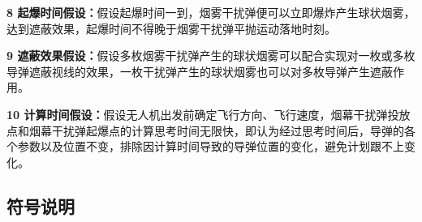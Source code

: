 \documentclass[withoutpreface,bwprint]{cumcmthesis} %
\begin{document}
\textbf{8 起爆时间假设：}假设起爆时间一到，烟雾干扰弹便可以立即爆炸产生球状烟雾，达到遮蔽效果，起爆时间不得晚于烟雾干扰弹平抛运动落地时刻。

\textbf{9 遮蔽效果假设：}假设多枚烟雾干扰弹产生的球状烟雾可以配合实现对一枚或多枚导弹遮蔽视线的效果，一枚干扰弹产生的球状烟雾也可以对多枚导弹产生遮蔽作用。

\textbf{10 计算时间假设：}假设无人机出发前确定飞行方向、飞行速度，烟幕干扰弹投放点和烟幕干扰弹起爆点的计算思考时间无限快，即认为经过思考时间后，导弹的各个参数以及位置不变，排除因计算时间导致的导弹位置的变化，避免计划跟不上变化。

\subsection{符号说明}
            
\setlength{\LTpre}{6pt}   %
\setlength{\LTpost}{6pt}
\end{document}
